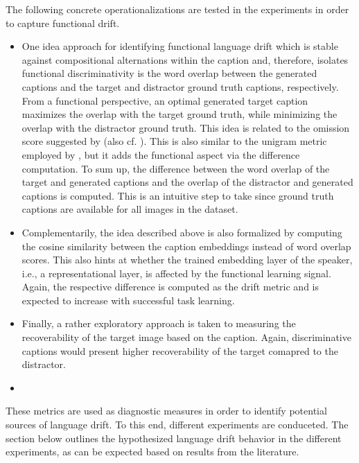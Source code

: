 The following concrete operationalizations are tested in the experiments in order to capture functional drift. \begin{itemize}
	\item One idea approach for identifying functional language drift which is stable against compositional alternations within the caption and, therefore, isolates functional discriminativity is the word overlap between the generated captions and the target and distractor ground truth captions, respectively. From a functional perspective, an optimal generated target caption maximizes the overlap with the target ground truth, while minimizing the overlap with the distractor ground truth. This idea is related to the omission score suggested by \cite{havrylov2017emergence} (also cf. \cite{andreas2016reasoning, gunel2020supervised}). This is also similar to the unigram metric employed by \cite{lazaridou2020multi}, but it adds the functional aspect via the difference computation. To sum up, the difference between the word overlap of the target and generated captions and the overlap of the distractor and generated captions is computed. This is an intuitive step to take since ground truth captions are available for all images in the dataset.
	\item Complementarily, the idea described above is also formalized by computing the cosine similarity between the caption embeddings instead of word overlap scores. This also hints at whether the trained embedding layer of the speaker, i.e., a representational layer, is affected by the functional learning signal. Again, the respective difference is computed as the drift metric and is expected to increase with successful task learning.
	\item Finally, a rather exploratory approach is taken to measuring the recoverability of the target image based on the caption.  Again, discriminative captions would present higher recoverability of the target comapred to the distractor. 
	\item {}
\end{itemize}
These metrics are used as diagnostic measures in order to identify potential sources of language drift. To this end, different experiments are conduceted. The section below outlines the hypothesized language drift behavior in the different experiments, as can be expected based on results from the literature.

